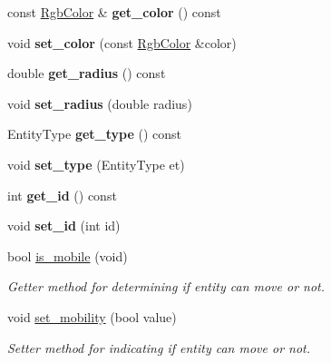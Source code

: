\begin{DoxyCompactItemize}
const \mbox{\hyperlink{struct_rgb_color}{Rgb\+Color}} \& {\bfseries get\+\_\+color} () const
\item 
\mbox{\label{class_arena_entity_a1ac33beda7462ac5c7f4f71a70d3fb10}} 
void {\bfseries set\+\_\+color} (const \mbox{\hyperlink{struct_rgb_color}{Rgb\+Color}} \&color)
\item 
\mbox{\label{class_arena_entity_a42d86d2d952b7f2a861d8a6cb46e661e}} 
double {\bfseries get\+\_\+radius} () const
\item 
\mbox{\label{class_arena_entity_a2b0c2512fe53d143442da5e357f71505}} 
void {\bfseries set\+\_\+radius} (double radius)
\item 
\mbox{\label{class_arena_entity_a19e75df5ce971f48e9a522a343a39fb3}} 
Entity\+Type {\bfseries get\+\_\+type} () const
\item 
\mbox{\label{class_arena_entity_aa65c584906d4c22f61488fab98c3392c}} 
void {\bfseries set\+\_\+type} (Entity\+Type et)
\item 
\mbox{\label{class_arena_entity_ae50750dfde8118c27835ea8e9db8b7ef}} 
int {\bfseries get\+\_\+id} () const
\item 
\mbox{\label{class_arena_entity_a67f4c0467d32eec76ee6ed033ff9ed2f}} 
void {\bfseries set\+\_\+id} (int id)
\item 
\mbox{\label{class_arena_entity_a9cfea21220c07502abd084afde49ae65}} 
bool \mbox{\hyperlink{class_arena_entity_a9cfea21220c07502abd084afde49ae65}{is\+\_\+mobile}} (void)
\begin{DoxyCompactList}\small\item\em Getter method for determining if entity can move or not. \end{DoxyCompactList}\item 
\mbox{\label{class_arena_entity_adb5d3089fec5c28cc989e5834fcdaf6c}} 
void \mbox{\hyperlink{class_arena_entity_adb5d3089fec5c28cc989e5834fcdaf6c}{set\+\_\+mobility}} (bool value)
\begin{DoxyCompactList}\small\item\em Setter method for indicating if entity can move or not. \end{DoxyCompactList}\end{DoxyCompactItemize}


